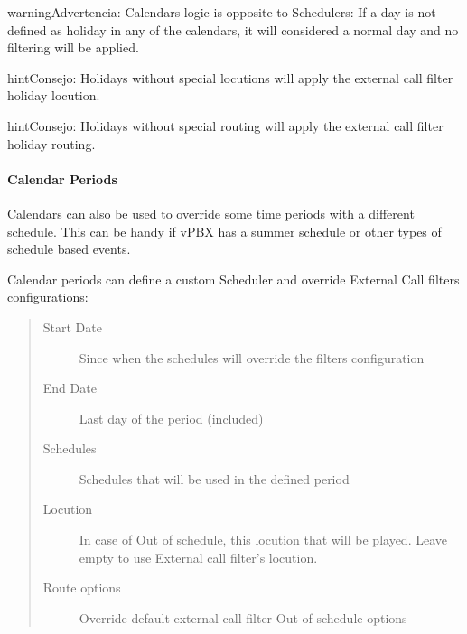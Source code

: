 \documentclass[letterpaper,10pt,spanish]{sphinxmanual}
\begin{document}
\begin{notice}{warning}{Advertencia:}
Calendars logic is opposite to Schedulers: If a day is not defined
as holiday in any of the calendars, it will considered a normal day and no
filtering will be applied.
\end{notice}

\begin{notice}{hint}{Consejo:}
Holidays without special locutions will apply the external call filter
holiday locution.
\end{notice}

\begin{notice}{hint}{Consejo:}
Holidays without special routing will apply the external call filter
holiday routing.
\end{notice}


\paragraph{Calendar Periods}
\label{administration_portal/client/vpbx/routing_tools/calendars:calendar-periods}\label{administration_portal/client/vpbx/routing_tools/calendars:id2}
Calendars can also be used to override some time periods with a different schedule.
This can be handy if vPBX has a summer schedule or other types of schedule based events.

Calendar periods can define a custom Scheduler and override External Call filters configurations:
\begin{quote}
\begin{description}
\item[{Start Date}] \leavevmode
Since when the schedules will override the filters configuration

\item[{End Date}] \leavevmode
Last day of the period (included)

\item[{Schedules}] \leavevmode
Schedules that will be used in the defined period

\item[{Locution}] \leavevmode
In case of Out of schedule, this locution that will be played. Leave empty to use External
call filter's locution.

\item[{Route options}] \leavevmode
Override default external call filter Out of schedule options

\end{description}
\end{quote}
\end{document}
